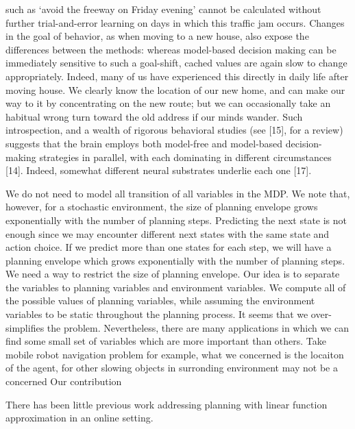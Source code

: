 such as ‘avoid the freeway on Friday evening’ cannot be calculated without further trial-and-error learning on days in which this traffic jam occurs.
Changes in the goal of behavior, as when moving to a new house, also expose the differences between the methods: whereas model-based
decision making can be immediately sensitive to such a goal-shift, cached values are again slow to change appropriately. Indeed, many of us have
experienced this directly in daily life after moving house. We clearly know the location of our new home, and can make our way to it by
concentrating on the new route; but we can occasionally take an habitual wrong turn toward the old address if our minds wander. Such
introspection, and a wealth of rigorous behavioral studies (see [15], for a review) suggests that the brain employs both model-free and model-based
decision-making strategies in parallel, with each dominating in different circumstances [14]. Indeed, somewhat different neural substrates underlie
each one [17].


We do not need to model all transition of all variables in the MDP.
We note that, however, for a stochastic environment, the size of planning envelope grows exponentially with the number of planning
steps. Predicting the next state is not enough since we may encounter different next states with the same state and action choice.
If we predict more than one states for each step, we will have a planning envelope which grows exponentially with the number of planning
steps. We need a way to restrict the size of planning envelope. Our idea is to separate the variables to planning variables 
and environment variables. We compute all of the possible values of planning variables, while assuming 
the environment variables to be static throughout the planning process.  
It seems that we over-simplifies the problem. Nevertheless, there are many applications
in which we can find some small set of variables which are more important than others. Take 
mobile robot navigation problem for example, 
what we concerned is the locaiton of the agent, 
for other slowing objects in surronding environment may not be a concerned 
Our contribution


There has been little previous work addressing planning
with linear function approximation in an online setting.


